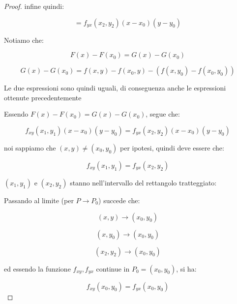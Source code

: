 \documentclass[../appunti-analisi.tex]{subfiles}
\begin{document}
\begin{proof}
       infine quindi:

       \[
           = f_{yx}(x_2,y_2)(x-x_0)(y-y_0)
       \]


       Notiamo che:

       \[
           F(x) - F(x_0) = G(x) -G(x_0)
       \]

       \[
           G(x) - G(x_0) = f(x,y) - f(x_0,y) - (f(x,y_0) -f(x_0,y_0))
       \] 

       Le due espressioni sono quindi uguali, di conseguenza anche le espressioni ottenute precedentemente

       Essendo $F(x) - F(x_0) = G(x) - G(x_0)$, segue che:

       \[
           f_{xy}(x_1,y_1)(x-x_0)(y-y_0) = f_{yx}(x_2,y_2)(x-x_0)(y-y_0)
       \]

       noi sappiamo che $(x,y) \neq (x_0,y_0)$ per ipotesi, quindi deve essere che:

       \[
           f_{xy}(x_1,y_1) = f_{yx}(x_2,y_2)
       \]

       $(x_1,y_1)$ e $(x_2,y_2)$ stanno nell'intervallo del rettangolo tratteggiato:


       \begin{center}
       \end{center}

       Passando al limite (per $P \rightarrow P_0$) succede che:

       \[
           (x,y) \rightarrow (x_0,y_0)
       \]

       \[
           (x,y_0) \rightarrow (x_0,y_0)
       \]

       \[
           (x_2,y_2) \rightarrow (x_0,y_0)
       \]

       ed essendo la funzione $f_{xy},f_{yx}$ continue in $P_0=(x_0,y_0)$, si ha:

       \[
           f_{xy}(x_0,y_0) = f_{yx}(x_0,y_0)
       \]


\end{proof}
\end{document}
